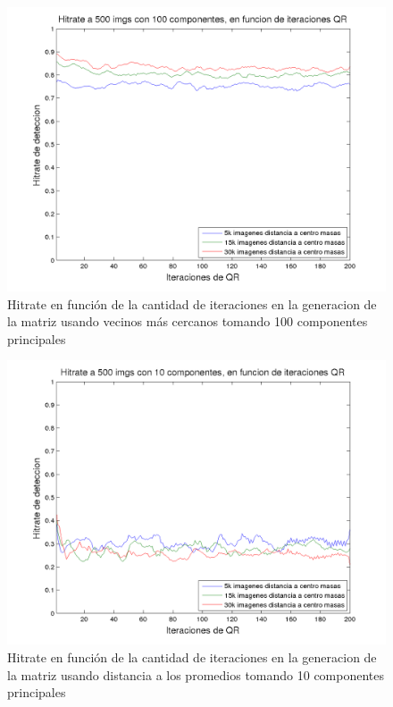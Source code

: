 \begin{figure}[H]
\begin {center}
\includegraphics[width=\hrwidth]{plots/HR_100_1.png}
\end {center}
\caption{Hitrate en funci\'on de la cantidad de iteraciones en la generacion de la matriz
usando vecinos m\'as cercanos tomando 100 componentes principales}
\label{fig:HR10Neig}
\end{figure}


\begin{figure}[H]
\begin {center}
\includegraphics[width=\hrwidth]{plots/HR_10_1.png}
\end {center}
\caption{Hitrate en funci\'on de la cantidad de iteraciones en la generacion de la matriz
usando distancia a los promedios tomando 10 componentes principales}
\label{fig:HR10Avg}
\end{figure}


